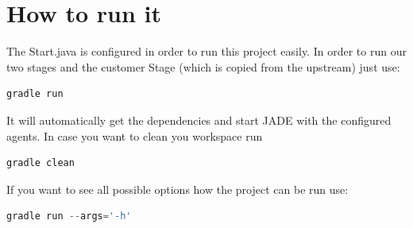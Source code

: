 \documentclass[10pt,a4paper]{article}
\begin{document}
	\section{How to run it}
	The Start.java is configured in order to run this project easily.
	In order to run our two stages and the customer Stage (which is copied from the upstream) just use:

	\begin{lstlisting}[language=Groovy,caption = Gradle run,frame=single, label={gradlerun} ]
	gradle run
	\end{lstlisting}

	\noindent It will automatically get the dependencies and start JADE with the configured agents.
	In case you want to clean you workspace run

	\begin{lstlisting}[language=Groovy,caption = Gradle clean,frame=single, label={gradleclean} ]
	gradle clean
	\end{lstlisting}
	If you want to see all possible options how the project can be run use:
	\begin{lstlisting}[language=Groovy,caption = Gradle run args,frame=single, label={gradlerunargs} ]
	gradle run --args='-h'
	\end{lstlisting}
\end{document}
